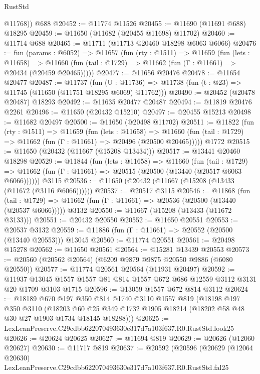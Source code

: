 \begin{lexlean}{RustStd}
\begin{coremodule}
        @11768))
    @688
@20452 := @11774 @11526
@20455 := @11690 (@11691 @688) @18295
@20459 := @11650 (@11682 (@20455 @11698) @11702)
@20460 := @11714 @688
@20465 := @11711 (@11713 @20460 @18298 @6063 @6066)
@20476 := fun (params : @6052) =>
  @11657
    (fun (rty : @1511) =>
    @11659
      (fun (lets : @11658) =>
      @11660 (fun (tail : @1729) => @11662 (fun (Γ : @11661) => @20434 (@20459 @20465)))))
@20477 := @11656 @20476
@20478 := @11654 @20477
@20487 := @11737
    (fun (U : @11736) => @11738 (fun (t : @23) => @11745 (@11650 (@11751 @18295 @6069) @11762)))
@20490 := @20452 (@20478 @20487) @18293
@20492 := @11635 @20477 @20487
@20494 := @11819 @20476 @2261
@20496 := @11650 (@20432 @15210)
@20497 := @20455 @15213
@20498 := @11682 @20497
@20500 := @11650 (@20498 @11702)
@20511 := @11822
    (fun (rty : @1511) =>
    @11659
      (fun (lets : @11658) =>
      @11660 (fun (tail : @1729) => @11662 (fun (Γ : @11661) => @20496 (@20500 @20465)))))
    @1772
@20515 := @11650 (@20432 (@11667 (@15208 @13434)))
@20517 := @13441 @20460 @18298
@20529 := @11844
    (fun (lets : @11658) =>
    @11660
      (fun (tail : @1729) =>
      @11662 (fun (Γ : @11661) => @20515 (@20500 (@13440 (@20517 @6063 @6066))))))
    @3115
@20536 := @11650 (@20432 (@11667 (@15208 (@13433 (@11672 (@3116 @6066))))))
@20537 := @20517 @3115
@20546 := @11868
    (fun (tail : @1729) => @11662 (fun (Γ : @11661) => @20536 (@20500 (@13440 (@20537 @6066)))))
    @3132
@20550 := @11667 (@15208 (@13433 (@11672 @3133)))
@20551 := @20432 @20550
@20552 := @11650 @20551
@20553 := @20537 @3132
@20559 := @11886 (fun (Γ : @11661) => @20552 (@20500 (@13440 @20553))) @13045
@20560 := @11774 @20551
@20561 := @20498 @15278
@20562 := @11650 @20561
@20564 := @15281 @13439 @20553
@20573 := @20560 (@20562 @20564) (@6209 @9879 @9875 @20550 @9886 (@6080 @20550))
@20577 := @11774 @20561 @20564 (@11931 @20497)
@20592 := @11937
    @13045
    @1557
    @1557
    @81
    @814
    @1557
    @672
    @686
    @12559
    @3112
    @3131
    @20
    @1709
    @3103
    @1715
@20596 := @13059 @1557 @672 @814 @3112
@20624 := @18189
    @670
    @197
    @350
    @814
    @1740
    @3110
    @1557
    @819
    (@18198
      @197
      @350
      @3110
      (@18203 @60 @25 @349 @1732 @1905 @18214 (@18202 @58 @48 @30 @27 @1903 @1734 @18145 @18288)))
@20625 := LexLeanPreserve.C29cdbb622070493630e317d7a103f637.R0.RustStd.look25
@20626 := @20624 @20625
@20627 := @11694 @819
@20629 := @20626 (@12060 @20627)
@20630 := @11717 @819
@20637 := @20592
    (@20596
      (@20629
        (@12064 @20630)
        LexLeanPreserve.C29cdbb622070493630e317d7a103f637.R0.RustStd.fal25

\end{coremodule}
\end{lexlean}
